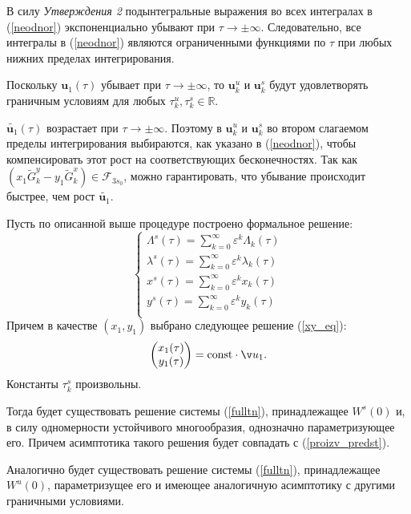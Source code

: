 В силу \textit{Утверждения 2} подынтегральные выражения во всех интегралах в (\ref{neodnor}) экспоненциально убывают при $\tau \rightarrow \pm \infty$. Следовательно, все интегралы в (\ref{neodnor}) являются ограниченными функциями по $\tau$ при любых нижних пределах интегрирования.

Поскольку $\mathbf{u}_1(\tau)$ убывает при $\tau \rightarrow \pm \infty$, то $\mathbf{u}_k^u$ и $\mathbf{u}_k^s$ будут удовлетворять граничным условиям для любых $\tau^u_k, \tau^s_k \in \mathbb{R}$.

$\tilde{\mathbf{u}_1}(\tau)$ возрастает при $\tau \rightarrow \pm \infty$. Поэтому в $\mathbf{u}_k^u$ и $\mathbf{u}_k^s$ во втором слагаемом пределы интегрирования выбираются, как указано в (\ref{neodnor}), чтобы компенсировать этот рост на соответствующих бесконечностях. Так как $(x_1 \tilde G_k^y - y_1 \tilde G_k^x) \in \mathcal{F}_{3s_0}$, можно гарантировать, что убывание происходит быстрее, чем рост $\tilde{\mathbf{u}_1}$.

\begin{utv}
Пусть по описанной выше процедуре построено формальное решение:
\begin{equation}
    \begin{cases}
\Lambda^s(\tau) = \sum_{k=0}^\infty \varepsilon^k \Lambda_k(\tau)\\
\lambda^s(\tau) = \sum_{k=0}^\infty \varepsilon^k \lambda_k(\tau)\\
x^s(\tau) =       \sum_{k=0}^\infty \varepsilon^k x_k(\tau)\\
y^s(\tau) =       \sum_{k=0}^\infty \varepsilon^k y_k(\tau)\\
\end{cases}
\label{proizv_predst}
\end{equation}
Причем в качестве $(x_1,y_1)$ выбрано следующее решение (\ref{xy_eq}):
\begin{align*}
    \begin{pmatrix} x_1(\tau) \\ y_1(\tau) \end{pmatrix} = \text{const} \cdot \v u_1.
\end{align*}
Константы $\tau_k^{s}$ произвольны.

Тогда будет существовать решение системы (\ref{fulltn}), принадлежащее $W^s(0)$ и, в силу одномерности устойчивого многообразия, однозначно параметризующее его.
Причем асимптотика такого решения будет совпадать с (\ref{proizv_predst}).

Аналогично будет существовать решение системы (\ref{fulltn}), принадлежащее $W^u(0)$, параметризущее его и имеющее аналогичную асимптотику с другими граничными условиями.

\end{utv}


